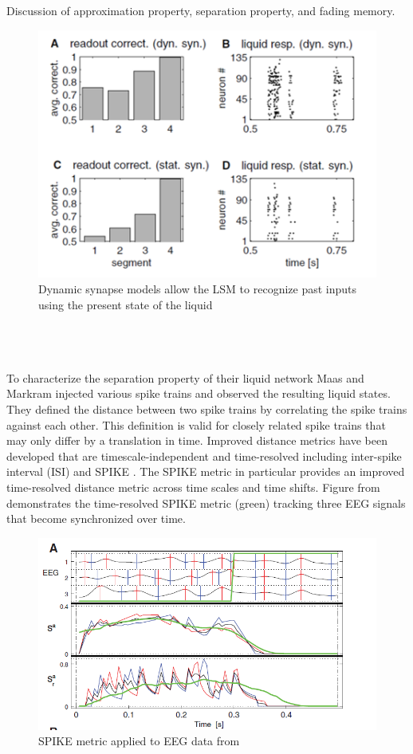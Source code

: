 \documentclass[a4paper,11pt]{article}
\begin{document}
Discussion of approximation property, separation property, and fading memory.
\\
\begin{figure}[ht]
 \caption{Dynamic synapse models allow the LSM to recognize past inputs using the present state of the liquid \cite{maas2002}}
 \centering
   \includegraphics[width=\textwidth]{fig/maas_memory}
\end{figure}\\
\\ \\
To characterize the separation property of their liquid network Maas and Markram injected various spike trains and observed the resulting liquid states.
They defined the distance between two spike trains by correlating the spike trains against each other.
This definition is valid for closely related spike trains that may only differ by a translation in time.  
Improved distance metrics have been developed that are timescale-independent and time-resolved including inter-spike interval (ISI) and SPIKE \cite{kreuz2012}.
The SPIKE metric in particular provides an improved time-resolved distance metric across time scales and time shifts.
Figure from \cite{kreuz2012} demonstrates the time-resolved SPIKE metric (green) tracking three EEG signals that become synchronized over time.
\begin{figure}[ht]
	\caption{SPIKE metric applied to EEG data from \cite{kreuz2012}}
	\centering
	\includegraphics[width=\textwidth]{fig/SPIKE}
\end{figure}\\
\end{document}
